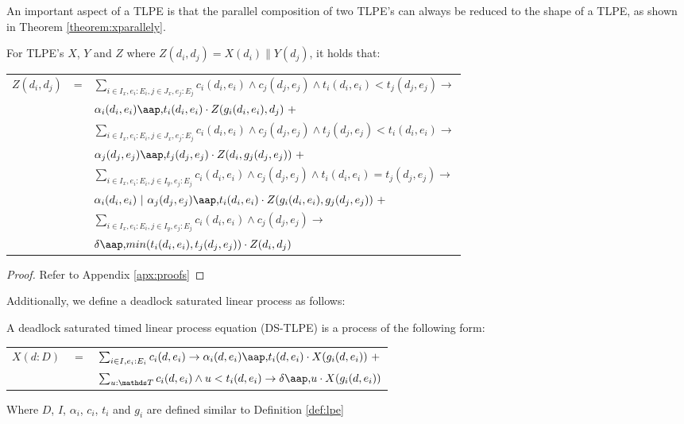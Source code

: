 An important aspect of a TLPE is that the parallel composition of two TLPE's can always be reduced to the shape of a TLPE, as shown in Theorem \ref{theorem:xparallely}.
\\
\begin{theorem} \label{theorem:xparallely} For TLPE's $X$, $Y$ and $Z$ where $Z(d_i, d_j) = X(d_i) \parallel Y(d_j)$, it holds that: \\
\begin{tabular}{lll}
$Z(d_i, d_j)$ & = & $\sum_{i \in I_x, e_i: E_i, j \in J_x, e_j: E_j} c_i(d_i,e_i) \land c_j(d_j,e_j) \land t_i(d_i,e_i) < t_j(d_j,e_j) \rightarrow$ \\
& & $\alpha_i(d_i,e_i) \at t_i(d_i,e_i) \cdot Z(g_i(d_i,e_i), d_j)~+$ \\
& & $\sum_{i \in I_x, e_i: E_i, j \in J_x, e_j: E_j} c_i(d_i,e_i) \land c_j(d_j,e_j) \land t_j(d_j,e_j) < t_i(d_i,e_i) \rightarrow$ \\
& & $\alpha_j(d_j,e_j) \at t_j(d_j,e_j) \cdot Z(d_i, g_j(d_j,e_j))~+$ \\
& & $\sum_{i \in I_x, e_i: E_i, j \in I_y, e_j: E_j} c_i(d_i,e_i) \land c_j(d_j,e_j) \land t_i(d_i,e_i) = t_j(d_j,e_j) \rightarrow$ \\
& & $\alpha_i(d_i,e_i) \comm \alpha_j(d_j,e_j) \at t_i(d_i,e_i) \cdot Z(g_i(d_i,e_i), g_j(d_j,e_j))~+$ \\
& & $\sum_{i \in I_x, e_i: E_i, j \in I_y, e_j: E_j} c_i(d_i,e_i) \land c_j(d_j,e_j) \rightarrow$ \\
& & $\delta \at min(t_i(d_i,e_i), t_j(d_j,e_j)) \cdot Z(d_i,d_j)$ \\
\end{tabular}
\end{theorem}
\begin{proof} Refer to Appendix \ref{apx:proofs} \end{proof}

Additionally, we define a deadlock saturated linear process as follows:
\\
\begin{definition}
A deadlock saturated timed linear process equation (DS-TLPE) is a process of the following form:

\begin{tabular}{lcl}
$X(d:D)$ & $=$ & $\sum_{i \in I, e_i: E_i} c_i(d,e_i) \rightarrow \alpha_i(d, e_i) \at t_i(d, e_i) \cdot X(g_i(d, e_i))~+$ \\
         &     & $\sum_{u: \TTT} c_i(d,e_i) \land u < t_i(d, e_i) \rightarrow \delta \at u \cdot X(g_i(d, e_i))$ \\
\end{tabular}

Where $D$, $I$, $\alpha_i$, $c_i$, $t_i$ and $g_i$ are defined similar to Definition \ref{def:lpe}
\end{definition}


